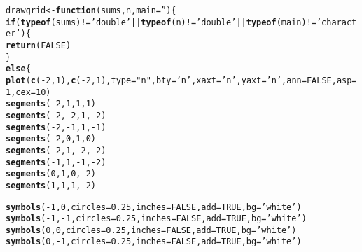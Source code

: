 \documentclass[12pt]{article}\usepackage[]{graphicx}\usepackage[]{color}
\makeatletter
\newcommand{\hlnum}[1]{\textcolor[rgb]{0.686,0.059,0.569}{#1}}%
\newcommand{\hlstr}[1]{\textcolor[rgb]{0.192,0.494,0.8}{#1}}%
\newcommand{\hlopt}[1]{\textcolor[rgb]{0,0,0}{#1}}%
\newcommand{\hlstd}[1]{\textcolor[rgb]{0.345,0.345,0.345}{#1}}%
\newcommand{\hlkwa}[1]{\textcolor[rgb]{0.161,0.373,0.58}{\textbf{#1}}}%
\newcommand{\hlkwb}[1]{\textcolor[rgb]{0.69,0.353,0.396}{#1}}%
\newcommand{\hlkwc}[1]{\textcolor[rgb]{0.333,0.667,0.333}{#1}}%
\newcommand{\hlkwd}[1]{\textcolor[rgb]{0.737,0.353,0.396}{\textbf{#1}}}%
\newenvironment{kframe}{%
 \def\at@end@of@kframe{}%
 \ifinner\ifhmode%
  \def\at@end@of@kframe{\end{minipage}}%
  \begin{minipage}{\columnwidth}%
 \fi\fi%
 \def\FrameCommand##1{\hskip\@totalleftmargin \hskip-\fboxsep
 \colorbox{shadecolor}{##1}\hskip-\fboxsep
     \hskip-\linewidth \hskip-\@totalleftmargin \hskip\columnwidth}%
 \MakeFramed {\advance\hsize-\width
   \@totalleftmargin\z@ \linewidth\hsize
   \@setminipage}}%
 {\par\unskip\endMakeFramed%
 \at@end@of@kframe}
\newenvironment{knitrout}{}{} %
\makeatother
\begin{document}
\begin{knitrout}
\color{fgcolor}\begin{kframe}
\begin{alltt}
\hlstd{drawgrid} \hlkwb{<-} \hlkwa{function}\hlstd{(}\hlkwc{sums}\hlstd{,} \hlkwc{n}\hlstd{,} \hlkwc{main}\hlstd{=}\hlstr{''}\hlstd{)\{}
  \hlkwa{if} \hlstd{(}\hlkwd{typeof}\hlstd{(sums)}\hlopt{!=}\hlstr{'double'}\hlopt{||}\hlkwd{typeof}\hlstd{(n)}\hlopt{!=}\hlstr{'double'}\hlopt{||}\hlkwd{typeof}\hlstd{(main)}\hlopt{!=}\hlstr{'character'}\hlstd{)\{}
    \hlkwd{return}\hlstd{(}\hlnum{FALSE}\hlstd{)}
  \hlstd{\}}
  \hlkwa{else}\hlstd{\{}
    \hlkwd{plot}\hlstd{(}\hlkwd{c}\hlstd{(}\hlopt{-}\hlnum{2}\hlstd{,}\hlnum{1}\hlstd{),}\hlkwd{c}\hlstd{(}\hlopt{-}\hlnum{2}\hlstd{,}\hlnum{1}\hlstd{),}\hlkwc{type}\hlstd{=}\hlstr{"n"}\hlstd{,}\hlkwc{bty}\hlstd{=}\hlstr{'n'}\hlstd{,}\hlkwc{xaxt}\hlstd{=}\hlstr{'n'}\hlstd{,}\hlkwc{yaxt}\hlstd{=}\hlstr{'n'}\hlstd{,}\hlkwc{ann}\hlstd{=}\hlnum{FALSE}\hlstd{,}\hlkwc{asp}\hlstd{=}\hlnum{1}\hlstd{,}\hlkwc{cex}\hlstd{=}\hlnum{10}\hlstd{)}
    \hlkwd{segments}\hlstd{(}\hlopt{-}\hlnum{2}\hlstd{,} \hlnum{1}\hlstd{,} \hlnum{1}\hlstd{,} \hlnum{1}\hlstd{)}
    \hlkwd{segments}\hlstd{(}\hlopt{-}\hlnum{2}\hlstd{,} \hlopt{-}\hlnum{2}\hlstd{,} \hlnum{1}\hlstd{,} \hlopt{-}\hlnum{2}\hlstd{)}
    \hlkwd{segments}\hlstd{(}\hlopt{-}\hlnum{2}\hlstd{,} \hlopt{-}\hlnum{1}\hlstd{,} \hlnum{1}\hlstd{,} \hlopt{-}\hlnum{1}\hlstd{)}
    \hlkwd{segments}\hlstd{(}\hlopt{-}\hlnum{2}\hlstd{,} \hlnum{0}\hlstd{,} \hlnum{1}\hlstd{,} \hlnum{0}\hlstd{)}
    \hlkwd{segments}\hlstd{(}\hlopt{-}\hlnum{2}\hlstd{,} \hlnum{1}\hlstd{,} \hlopt{-}\hlnum{2}\hlstd{,} \hlopt{-}\hlnum{2}\hlstd{)}
    \hlkwd{segments}\hlstd{(}\hlopt{-}\hlnum{1}\hlstd{,} \hlnum{1}\hlstd{,} \hlopt{-}\hlnum{1}\hlstd{,} \hlopt{-}\hlnum{2}\hlstd{)}
    \hlkwd{segments}\hlstd{(}\hlnum{0}\hlstd{,} \hlnum{1}\hlstd{,} \hlnum{0}\hlstd{,} \hlopt{-}\hlnum{2}\hlstd{)}
    \hlkwd{segments}\hlstd{(}\hlnum{1}\hlstd{,} \hlnum{1}\hlstd{,} \hlnum{1}\hlstd{,} \hlopt{-}\hlnum{2}\hlstd{)}

    \hlkwd{symbols}\hlstd{(}\hlopt{-}\hlnum{1}\hlstd{,} \hlnum{0}\hlstd{,} \hlkwc{circles} \hlstd{=} \hlnum{0.25}\hlstd{,} \hlkwc{inches} \hlstd{=} \hlnum{FALSE}\hlstd{,} \hlkwc{add} \hlstd{=} \hlnum{TRUE}\hlstd{,} \hlkwc{bg} \hlstd{=} \hlstr{'white'}\hlstd{)}
    \hlkwd{symbols}\hlstd{(}\hlopt{-}\hlnum{1}\hlstd{,} \hlopt{-}\hlnum{1}\hlstd{,} \hlkwc{circles} \hlstd{=} \hlnum{0.25}\hlstd{,} \hlkwc{inches} \hlstd{=} \hlnum{FALSE}\hlstd{,} \hlkwc{add} \hlstd{=} \hlnum{TRUE}\hlstd{,} \hlkwc{bg} \hlstd{=} \hlstr{'white'}\hlstd{)}
    \hlkwd{symbols}\hlstd{(}\hlnum{0}\hlstd{,} \hlnum{0}\hlstd{,} \hlkwc{circles} \hlstd{=} \hlnum{0.25}\hlstd{,} \hlkwc{inches} \hlstd{=} \hlnum{FALSE}\hlstd{,} \hlkwc{add} \hlstd{=} \hlnum{TRUE}\hlstd{,} \hlkwc{bg} \hlstd{=} \hlstr{'white'}\hlstd{)}
    \hlkwd{symbols}\hlstd{(}\hlnum{0}\hlstd{,} \hlopt{-}\hlnum{1}\hlstd{,} \hlkwc{circles} \hlstd{=} \hlnum{0.25}\hlstd{,} \hlkwc{inches} \hlstd{=} \hlnum{FALSE}\hlstd{,} \hlkwc{add} \hlstd{=} \hlnum{TRUE}\hlstd{,} \hlkwc{bg} \hlstd{=} \hlstr{'white'}\hlstd{)}


\end{alltt}
\end{kframe}
\end{knitrout}
\end{document}

